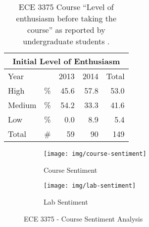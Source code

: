 \begin{table}[b!]
    \centering
    \begin{tabular}{lc|r|r|r}
        \multicolumn{5}{c}{Initial Level of Enthusiasm} \\ \hline\hline
        \multicolumn{2}{l}{Year} & \multicolumn{1}{|c}{2013} & \multicolumn{1}{|c}{2014} & \multicolumn{1}{|c}{Total} \\ \hline
        High          & \%       & 45.6                     & 57.8                     & 53.0                      \\ 
        Medium        & \%       & 54.2                     & 33.3                     & 41.6                      \\
        Low           & \%       & 0.0                      & 8.9                      & 5.4                       \\ 
        Total         & \#       & 59                       & 90                       & 149                       \\ \hline
    \end{tabular}
    \caption{ECE 3375 Course ``Level of enthusiasm before taking the course'' as reported by undergraduate students \cite{evals:ece3375-2013, evals:ece3375-2014}.} 
    \label{table-course-enthusiasm-ece3375}
\end{table}


\begin{figure}
    \centering
    \begin{subfigure}{.8\linewidth}
        \centering
        \texttt{[image: img/course-sentiment]}
        \caption{Course Sentiment}
        \label{fig:ece-3375-course-sentiment}
    \end{subfigure}
    
    \begin{subfigure}{.8\linewidth}
        \centering
        \texttt{[image: img/lab-sentiment]}
        \caption{Lab Sentiment}
        \label{fig:ece-3375-lab-sentiment}
    \end{subfigure}
    
    \caption{ECE 3375 - Course Sentiment Analysis\cite{evals:ece3375-2013, evals:ece3375-2014}}
\end{figure}

